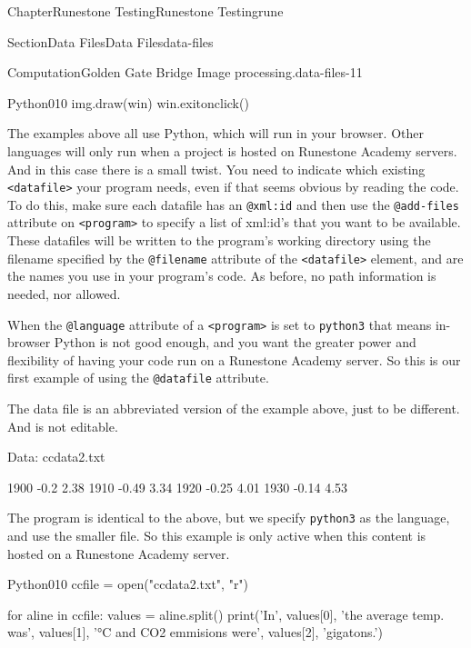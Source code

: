 \documentclass[oneside,10pt,]{book}
\newcommand{\mono}[1]{\texttt{#1}}
\numberwithin{equation}{section}
\begin{document}
\begin{chapterptx}{Chapter}{Runestone Testing}{}{Runestone Testing}{}{}{rune}
\begin{sectionptx}{Section}{Data Files}{}{Data Files}{}{}{data-files}
\begin{computation}{Computation}{Golden Gate Bridge Image processing.}{data-files-11}
\begin{program}{Python}{0}{1}{0}
img.draw(win)
win.exitonclick()
\end{program}
\end{computation}
The examples above all use Python, which will run in your browser.   Other languages will only run when a project is hosted on Runestone Academy servers.  And in this case there is a small twist.  You need to indicate which existing \mono{<datafile>} your program needs, even if that seems obvious by reading the code.  To do this, make sure each datafile has an \mono{@xml:id} and then use the \mono{@add-files} attribute on \mono{<program>} to specify a list of xml:id's that you want to be available.  These datafiles will be written to the program's working directory using the filename specified by the \mono{@filename} attribute of the \mono{<datafile>} element, and are the names you use in your program's code.  As before, no path information is needed, nor allowed.%
\par
When the \mono{@language} attribute of a \mono{<program>} is set to \mono{python3} that means in-browser Python is not good enough, and you want the greater power and flexibility of having your code run on a Runestone Academy server.  So this is our first example of using the \mono{@datafile} attribute.%
\par
The data file is an abbreviated version of the example above, just to be different.  And is not editable.%
\begin{preformatted}
Data: ccdata2.txt
\end{preformatted}
\begin{preformatted}
1900    -0.2      2.38
1910    -0.49     3.34
1920    -0.25     4.01
1930    -0.14     4.53
\end{preformatted}
The program is identical to the above, but we specify \mono{python3} as the language, and use the smaller file.  So this example is only active when this content is hosted on a Runestone Academy server.%
\begin{program}{Python}{0}{1}{0}
ccfile = open("ccdata2.txt", "r")

for aline in ccfile:
    values = aline.split()
    print('In', values[0], 'the average temp. was', values[1], '°C and CO2 emmisions were', values[2], 'gigatons.')


\end{program}
\end{sectionptx}
\end{chapterptx}
\end{document}
